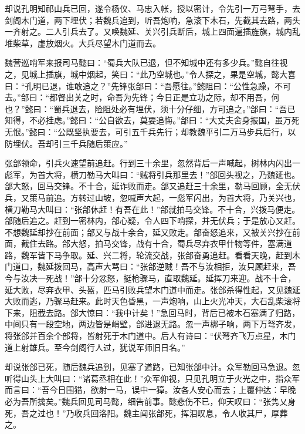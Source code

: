 却说孔明知祁山兵已回，遂令杨仪、马忠入帐，授以密计，令先引一万弓弩手，去剑阁木门道，两下埋伏；若魏兵追到，听吾炮响，急滚下木石，先截其去路，两头一齐射之。二人引兵去了。又唤魏延、关兴引兵断后，城上四面遍插旌旗，城内乱堆柴草，虚放烟火。大兵尽望木门道而去。

魏营巡哨军来报司马懿曰：“蜀兵大队已退，但不知城中还有多少兵。”懿自往视之，见城上插旗，城中烟起，笑曰：“此乃空城也。”令人探之，果是空城，懿大喜曰：“孔明已退，谁敢追之？”先锋张郃曰：“吾愿往。”懿阻曰：“公性急躁，不可去。”郃曰：“都督出关之时，命吾为先锋；今日正是立功之际，却不用吾，何也？”懿曰：“蜀兵退去，险阻处必有埋伏，须十分仔细，方可追之。”郃曰：“吾已知得，不必挂虑。”懿曰：“公自欲去，莫要追悔。”郃曰：“大丈夫舍身报国，虽万死无恨。”懿曰：“公既坚执要去，可引五千兵先行；却教魏平引二万马步兵后行，以防埋伏。吾却引三千兵随后策应。”

张郃领命，引兵火速望前追赶。行到三十余里，忽然背后一声喊起，树林内闪出一彪军，为首大将，横刀勒马大叫曰：“贼将引兵那里去！”郃回头视之，乃魏延也。郃大怒，回马交锋。不十合，延诈败而走。郃又追赶三十余里，勒马回顾，全无伏兵，又策马前追。方转过山坡，忽喊声大起，一彪军闪出，为首大将，乃关兴也，横刀勒马大叫曰：“张郃休赶！有吾在此！”郃就拍马交锋。不十合，兴拨马便走。郃随后追之。赶到一密林内，郃心疑，令人四下哨探，并无伏兵；于是放心又赶。不想魏延却抄在前面；郃又与战十余合，延又败走。郃奋怒追来，又被关兴抄在前面，截住去路。郃大怒，拍马交锋，战有十合，蜀兵尽弃衣甲什物等件，塞满道路，魏军皆下马争取。延、兴二将，轮流交战，张郃奋勇追赶。看看天晚，赶到木门道口，魏延拨回马，高声大骂曰：“张郃逆贼！吾不与汝相拒，汝只顾赶来，吾今与汝决一死战！”郃十分忿怒，挺枪骤马，直取魏延。延挥刀来迎。战不十合，延大败，尽弃衣甲、头盔，匹马引败兵望木门道中而走。张郃杀得性起，又见魏延大败而逃，乃骤马赶来。此时天色昏黑，一声炮响，山上火光冲天，大石乱柴滚将下来，阻截去路。郃大惊曰：“我中计矣！”急回马时，背后已被木石塞满了归路，中间只有一段空地，两边皆是峭壁，郃进退无路。忽一声梆子响，两下万弩齐发，将张郃并百余个部将，皆射死于木门道中。后人有诗曰：“伏弩齐飞万点星，木门道上射雄兵。至今剑阁行人过，犹说军师旧日名。”

却说张郃已死，随后魏兵追到，见塞了道路，已知张郃中计。众军勒回马急退。忽听得山头上大叫曰：“诸葛丞相在此！”众军仰视，只见孔明立于火光之中，指众军而言曰：“吾今日围猎，欲射一马，误中一獐。汝各人安心而去；上覆仲达：早晚必为吾所擒矣。”魏兵回见司马懿，细告前事。懿悲伤不已，仰天叹曰：“张隽乂身死，吾之过也！”乃收兵回洛阳。魏主闻张郃死，挥泪叹息，令人收其尸，厚葬之。

